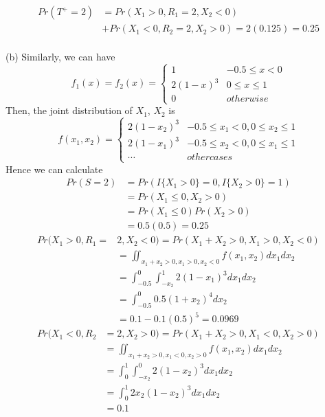 \documentclass[12pt,a4paper]{article}
\begin{document}
\begin{align*}
Pr(T^{+}=2)&=Pr(X_{1}>0,R_{1}=2,X_{2}<0)\\
&+Pr(X_{1}<0,R_{2}=2,X_{2}>0)=2(0.125)=0.25
\end{align*}
~\\
(b) Similarly, we can have
\begin{equation*}
f_{1}(x)=f_{2}(x)=
\begin{cases}
1& -0.5\leqslant x<0\\
2(1-x)^{3}& 0\leqslant x\leqslant 1\\
0& otherwise
\end{cases}
\end{equation*}
Then, the joint distribution of $X_{1}$, $X_{2}$ is
\begin{equation*}
f(x_{1},x_{2})=
\begin{cases}
2(1-x_{2})^{3}& -0.5\leqslant x_{1}< 0, 0\leqslant x_{2}\leqslant 1\\
2(1-x_{1})^{3}& -0.5\leqslant x_{2}< 0, 0\leqslant x_{1}\leqslant 1\\
\cdots & other cases
\end{cases}
\end{equation*}
Hence we can calculate
\begin{align*}
Pr(S=2)&=Pr\left(I\{X_{1}>0\}=0,I\{X_{2}>0\}=1\right)\\
&=Pr(X_{1}\leqslant 0, X_{2}>0)\\
&=Pr(X_{1}\leqslant0)Pr(X_{2}>0)\\
&=0.5(0.5)=0.25
\end{align*}
\begin{align*}
Pr(X_{1}>0,R_{1}=&2,X_{2}<0)=Pr(X_{1}+X_{2}>0,X_{1}>0,X_{2}<0)\\
&=\iint_{x_{1}+x_{2}>0,x_{1}>0,x_{2}<0} f(x_{1},x_{2})dx_{1}dx_{2}\\
&=\int_{-0.5}^{0}\int_{-x_{2}}^{1}2(1-x_{1})^{3}dx_{1}dx_{2}\\
&=\int_{-0.5}^{0}0.5(1+x_{2})^{4}dx_{2}\\
&=0.1-0.1(0.5)^{5}=0.0969
\end{align*}
\begin{align*}
Pr(X_{1}<0,R_{2}&=2,X_{2}>0)=Pr(X_{1}+X_{2}>0,X_{1}<0,X_{2}>0)\\
&=\iint_{x_{1}+x_{2}>0,x_{1}<0,x_{2}>0} f(x_{1},x_{2})dx_{1}dx_{2}\\
&=\int_{0}^{1}\int_{-x_{2}}^{0}2(1-x_{2})^{3}dx_{1}dx_{2}\\
&=\int_{0}^{1}2x_{2}(1-x_{2})^{3}dx_{1}dx_{2}\\
&=0.1
\end{align*}
\end{document}
